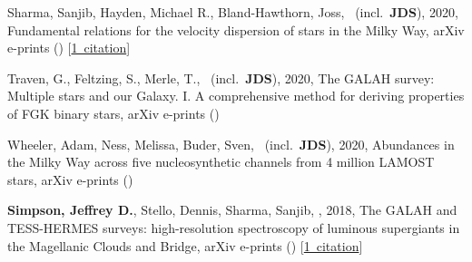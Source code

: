 \item[{\color{numcolor}\scriptsize4}] Sharma, Sanjib, Hayden, Michael R., Bland-Hawthorn, Joss, \etal\ (incl.\ \textbf{JDS}), 2020, Fundamental relations for the velocity dispersion of stars in the Milky Way, arXiv e-prints () [\href{https://ui.adsabs.harvard.edu/#abs/2020arXiv200406556S}{1~citation}]

\item[{\color{numcolor}\scriptsize3}] Traven, G., Feltzing, S., Merle, T., \etal\ (incl.\ \textbf{JDS}), 2020, The GALAH survey: Multiple stars and our Galaxy. I. A comprehensive method for deriving properties of FGK binary stars, arXiv e-prints ()

\item[{\color{numcolor}\scriptsize2}] Wheeler, Adam, Ness, Melissa, Buder, Sven, \etal\ (incl.\ \textbf{JDS}), 2020, Abundances in the Milky Way across five nucleosynthetic channels from 4 million LAMOST stars, arXiv e-prints ()

\item[{\color{numcolor}\scriptsize1}] \textbf{Simpson, Jeffrey D.}, Stello, Dennis, Sharma, Sanjib, \etal, 2018, The GALAH and TESS-HERMES surveys: high-resolution spectroscopy of luminous supergiants in the Magellanic Clouds and Bridge, arXiv e-prints () [\href{https://ui.adsabs.harvard.edu/#abs/2018arXiv180405900S}{1~citation}]